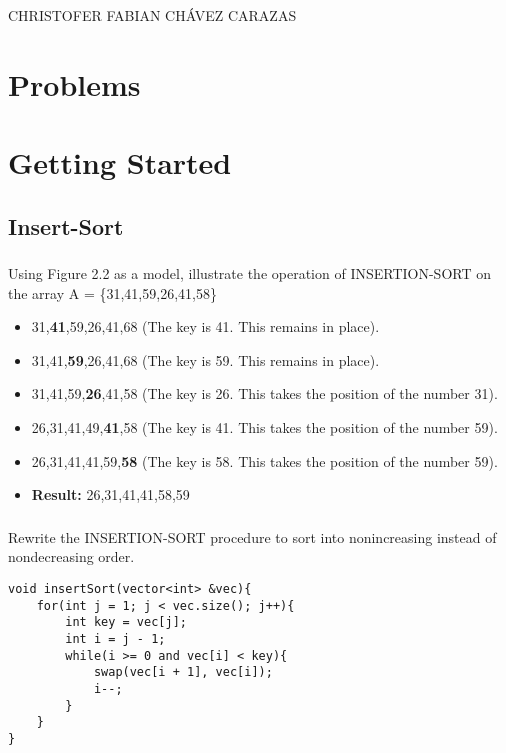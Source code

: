 \documentclass[a4paper,12pt]{article}
\begin{document}
\begin{LARGE}
 CHRISTOFER FABIAN CHÁVEZ CARAZAS
\end{LARGE}


\section{Problems}
\section{Getting Started}
  \subsection{Insert-Sort}
    \subsubsection{} Using Figure 2.2 as a model, illustrate the operation of INSERTION-SORT on the
    array \hspace{3mm}  A = \{31,41,59,26,41,58\} \\
    \begin{itemize}
     \item 31,\textbf{41},59,26,41,68   (The key is 41. This remains in place).
     \item 31,41,\textbf{59},26,41,68   (The key is 59. This remains in place).
     \item 31,41,59,\textbf{26},41,58   (The key is 26. This takes the position of the number 31).
     \item 26,31,41,49,\textbf{41},58   (The key is 41. This takes the position of the number 59).
     \item 26,31,41,41,59,\textbf{58}   (The key is 58. This takes the position of the number 59).
     \item \textbf{Result: } 26,31,41,41,58,59
    \end{itemize}
    \subsubsection{} Rewrite the INSERTION-SORT procedure to sort into nonincreasing instead of 
    nondecreasing order. \\
    \begin{lstlisting}
void insertSort(vector<int> &vec){
	for(int j = 1; j < vec.size(); j++){
		int key = vec[j];
		int i = j - 1;
		while(i >= 0 and vec[i] < key){
			swap(vec[i + 1], vec[i]);
			i--;
		}
	}
}
    \end{lstlisting}
\end{document}

